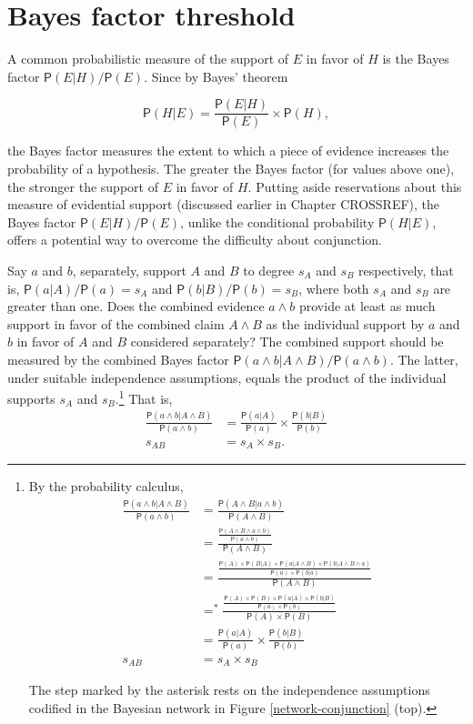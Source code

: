 \documentclass[10pt,dvipsnames,enabledeprecatedfontcommands]{scrartcl}
\newcommand{\et}{\wedge}
\newcommand{\pr}[1]{\mathsf{P}(#1)}
\begin{document}
\hypertarget{bayes-factor-threshold}{%
\section{Bayes factor threshold}\label{bayes-factor-threshold}}

A common probabilistic measure of the support of \(E\) in favor of \(H\)
is the Bayes factor \(\pr{E \vert H}/\pr{E}\). Since by Bayes' theorem

\[\pr{H \vert E} = \frac{\pr{E \vert H}}{\pr{E}}\times \pr{H},\]

\noindent the Bayes factor measures the extent to which a piece of
evidence increases the probability of a hypothesis. The greater the
Bayes factor (for values above one), the stronger the support of \(E\)
in favor of \(H\). Putting aside reservations about this measure of
evidential support (discussed earlier in Chapter CROSSREF), the Bayes
factor \(\pr{E | H}/\pr{E}\), unlike the conditional probability
\(\pr{H | E}\), offers a potential way to overcome the difficulty about
conjunction.

Say \(a\) and \(b\), separately, support \(A\) and \(B\) to degree
\(s_A\) and \(s_B\) respectively, that is, \(\pr{a | A}/\pr{a}=s_A\) and
\(\pr{b | B}/\pr{b}=s_B\), where both \(s_A\) and \(s_B\) are greater
than one. Does the combined evidence \(a \wedge b\) provide at least as
much support in favor of the combined claim \(A \wedge B\) as the
individual support by \(a\) and \(b\) in favor of \(A\) and \(B\)
considered separately? The combined support should be measured by the
combined Bayes factor \(\pr{a \wedge b| A\wedge B}/\pr{a \wedge b}\).
The latter, under suitable independence assumptions, equals the product
of the individual supports \(s_{A}\) and
\(s_{B}\).\footnote{By the probability calculus,
 \begin{align*}
\frac{\pr{a \wedge b| A\wedge B}}{\pr{a \wedge b}} & =  \frac{\pr{A \et B| a\wedge b}}{\pr{A \et B}}\\
& =  \frac{\frac{ \pr{A \et B \et a \wedge b }}{\pr{a \et b}}}{\pr{A \et B}} \\ 
& =  \frac{\frac{ \pr{A} \times \pr{B|A} \times \pr{a | A \wedge B} \times \pr{b | A \wedge B \wedge a}}{\pr{a} \times \pr{b | a}}}{\pr{A \et B}} \\ 
& =^*  \frac{\frac{\pr{A} \times \pr{B} \times \pr{a | A} \times \pr{b | B}}{\pr{a} \times \pr{b}}}{\pr{A} \times \pr{B}} \\ 
& =  \frac{\pr{a |A}}{\pr{a}} \times \frac{\pr{b |B}}{\pr{b}} \\
s_{AB}& =  s_{A}\times s_{B} 
 \end{align*}

\noindent
The step marked by the asterisk rests on the 
independence assumptions codified in the Bayesian network 
in Figure \ref{network-conjunction} (top).} That is, \begin{align*}
\frac{\pr{a \wedge b| A\wedge B}}{\pr{a \wedge b}} & =  \frac{\pr{a |A}}{\pr{a}} \times \frac{\pr{b |B}}{\pr{b}} \\
s_{AB}& =  s_{A}\times s_{B}.
 \end{align*}
\end{document}
